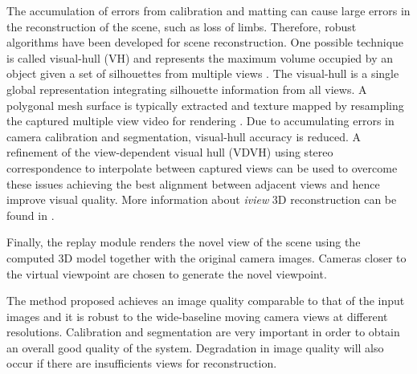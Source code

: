 The accumulation of errors from calibration and matting can cause large errors in
the reconstruction of the scene, such as loss of limbs. 
Therefore, robust algorithms have been developed for scene reconstruction.
One possible technique is called visual-hull (VH) and represents the maximum volume occupied by an object
given a set of silhouettes from multiple views \cite{2.2_iview_08}.
The visual-hull is a single global representation integrating silhouette information from all
views. A polygonal mesh surface is typically extracted and texture mapped by resampling
the captured multiple view video for rendering \cite{2.2_iview}.
Due to accumulating errors in camera calibration and segmentation, visual-hull accuracy is reduced.
A refinement of the view-dependent visual hull (VDVH) \cite{2.1_iview_12}
using stereo correspondence to interpolate between captured
views can be used to overcome these issues achieving the best alignment between adjacent views and 
hence improve visual quality.
More information about \textit{iview} 3D reconstruction can be found in \cite{02_iview,2.1_iview,2.2_iview}.

Finally, the replay module renders the novel view of the scene using the computed 3D model together with the
original camera images.
Cameras closer to the virtual viewpoint are chosen to generate the novel viewpoint.


The method proposed achieves an image quality comparable to that of the input images and it is robust to the
wide-baseline moving camera views at different resolutions.
Calibration and segmentation are very important in order to obtain an overall good quality of the system.
Degradation in image quality will also occur if there are insufficients views for reconstruction.







